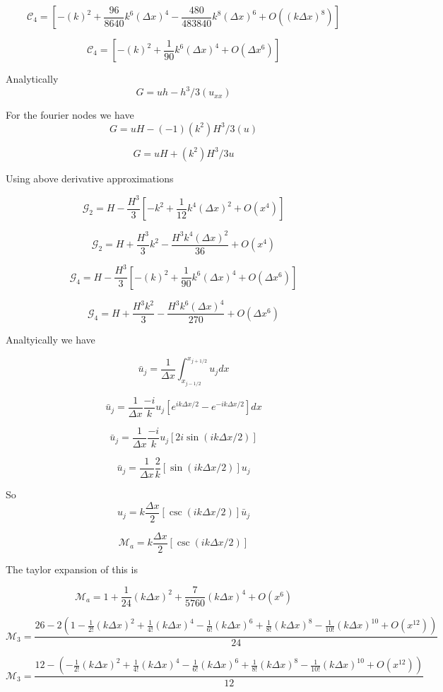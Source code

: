 \documentclass[12pt]{article}
\begin{document}
\[\mathcal{C}_4 = \left[- (k)^2  + \frac{96}{8640} k^6(\Delta x)^4 - \frac{480}{483840}k^8 (\Delta x)^6 + O((k \Delta x)^{8}) \right]\]

\[\mathcal{C}_4 = \left[- (k)^2  + \frac{1}{90} k^6(\Delta x)^4 + O(\Delta x^{6}) \right]\]

Analytically 
\[G = uh - h^3/3 (u_{xx})\]

For the fourier nodes we have
\[G = uH - (-1) (k^2) H^3/3 (u)\]

\[G = uH + (k^2) H^3/3 u\]

Using above derivative approximations

\[\mathcal{G}_2 = H -\frac{H^3}{3}\left[- k^2+ \frac{1}{12} k^4(\Delta x)^2 + O(x^{4}) \right] \]

\[\mathcal{G}_2 = H +\frac{H^3}{3} k^2 -\frac{H^3 k^4(\Delta x)^2}{36} + O(x^{4})\]

\[\mathcal{G}_4 = H -\frac{H^3}{3}\left[- (k)^2  + \frac{1}{90} k^6(\Delta x)^4 + O(\Delta x^{6}) \right] \]

\[\mathcal{G}_4 = H + \frac{H^3k^2}{3} -\frac{H^3 k^6 (\Delta x)^4}{270} + O(\Delta x^{6}) \]


Analtyically we have

\[\bar{u}_j = \frac{1}{\Delta x} \int_{x_{j - 1/2}}^{x_{j+ 1/2}} u_j dx\]

\[\bar{u}_j = \frac{1}{\Delta x}  \frac{-i}{k} u_j \left[e^{ik \Delta x/ 2} -e^{-ik \Delta x/ 2}\right] dx\]

\[\bar{u}_j = \frac{1}{\Delta x}  \frac{-i}{k} u_j \left[2i \sin\left(ik \Delta x/ 2\right)\right]\]

\[\bar{u}_j = \frac{1}{\Delta x}  \frac{2}{k} \left[\sin\left(ik \Delta x/ 2\right)\right] u_j\]

So 
\[u_j =  k\frac{\Delta x}{2} \left[\csc\left(ik \Delta x/ 2\right)\right] \bar{u}_j\]

\[\mathcal{M}_a = k\frac{\Delta x}{2} \left[\csc\left(ik \Delta x/ 2\right)\right] \]

The taylor expansion of this is

\[\mathcal{M}_a = 1 + \frac{1}{24} (k\Delta x)^2 + \frac{7}{5760} (k\Delta x)^4 + O(x^{6}) \]

\[\mathcal{M}_3= \frac{26  -2\left(1 - \frac{1}{2!} (k\Delta x)^2 + \frac{1}{4!} (k\Delta x)^4 - \frac{1}{6!} (k\Delta x)^6 + \frac{1}{8!} (k\Delta x)^8 - \frac{1}{10!} (k\Delta x)^{10} + O(x^{12})\right)}{24}\]

\[\mathcal{M}_3= \frac{12 -\left(- \frac{1}{2!} (k\Delta x)^2 + \frac{1}{4!} (k\Delta x)^4 - \frac{1}{6!} (k\Delta x)^6 + \frac{1}{8!} (k\Delta x)^8 - \frac{1}{10!} (k\Delta x)^{10} + O(x^{12})\right)}{12}\]
\end{document}
